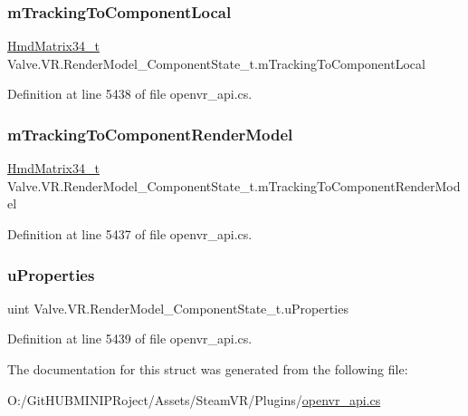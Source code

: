 \subsubsection{\texorpdfstring{mTrackingToComponentLocal}{mTrackingToComponentLocal}}
{\footnotesize\ttfamily \mbox{\hyperlink{struct_valve_1_1_v_r_1_1_hmd_matrix34__t}{Hmd\+Matrix34\+\_\+t}} Valve.\+V\+R.\+Render\+Model\+\_\+\+Component\+State\+\_\+t.\+m\+Tracking\+To\+Component\+Local}



Definition at line 5438 of file openvr\+\_\+api.\+cs.

\mbox{\label{struct_valve_1_1_v_r_1_1_render_model___component_state__t_a55ef2d1230407eb02524c200b515ef3c}} 
\subsubsection{\texorpdfstring{mTrackingToComponentRenderModel}{mTrackingToComponentRenderModel}}
{\footnotesize\ttfamily \mbox{\hyperlink{struct_valve_1_1_v_r_1_1_hmd_matrix34__t}{Hmd\+Matrix34\+\_\+t}} Valve.\+V\+R.\+Render\+Model\+\_\+\+Component\+State\+\_\+t.\+m\+Tracking\+To\+Component\+Render\+Model}



Definition at line 5437 of file openvr\+\_\+api.\+cs.

\mbox{\label{struct_valve_1_1_v_r_1_1_render_model___component_state__t_a629c200025bca9adee21f5d68927468f}} 
\subsubsection{\texorpdfstring{uProperties}{uProperties}}
{\footnotesize\ttfamily uint Valve.\+V\+R.\+Render\+Model\+\_\+\+Component\+State\+\_\+t.\+u\+Properties}



Definition at line 5439 of file openvr\+\_\+api.\+cs.



The documentation for this struct was generated from the following file\+:\begin{DoxyCompactItemize}
\item 
O\+:/\+Git\+H\+U\+B\+M\+I\+N\+I\+P\+Roject/\+Assets/\+Steam\+V\+R/\+Plugins/\mbox{\hyperlink{openvr__api_8cs}{openvr\+\_\+api.\+cs}}\end{DoxyCompactItemize}
